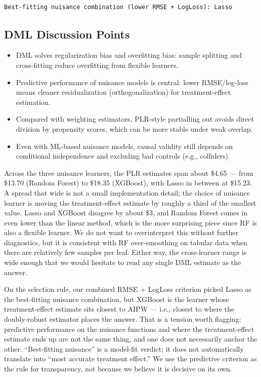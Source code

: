 \documentclass[
  letterpaper,
  DIV=11,
  numbers=noendperiod]{scrartcl}
\providecommand{\tightlist}{%
  \setlength{\itemsep}{0pt}\setlength{\parskip}{0pt}}
\begin{document}
\begin{verbatim}

Best-fitting nuisance combination (lower RMSE + LogLoss): Lasso 
\end{verbatim}

\subsection{DML Discussion Points}\label{dml-discussion-points}

\begin{itemize}
\tightlist
\item
  DML solves regularization bias and overfitting bias: sample splitting
  and cross-fitting reduce overfitting from flexible learners.
\item
  Predictive performance of nuisance models is central: lower
  RMSE/log-loss means cleaner residualization (orthogonalization) for
  treatment-effect estimation.
\item
  Compared with weighting estimators, PLR-style partialling out avoids
  direct division by propensity scores, which can be more stable under
  weak overlap.
\item
  Even with ML-based nuisance models, causal validity still depends on
  conditional independence and excluding bad controls (e.g., colliders).
\end{itemize}

Across the three nuisance learners, the PLR estimates span about \$4.65
--- from \$13.70 (Random Forest) to \$18.35 (XGBoost), with Lasso in
between at \$15.23. A spread that wide is not a small implementation
detail; the choice of nuisance learner is moving the treatment-effect
estimate by roughly a third of the smallest value. Lasso and XGBoost
disagree by about \$3, and Random Forest comes in even lower than the
linear method, which is the more surprising piece since RF is also a
flexible learner. We do not want to overinterpret this without further
diagnostics, but it is consistent with RF over-smoothing on tabular data
when there are relatively few samples per leaf. Either way, the
cross-learner range is wide enough that we would hesitate to read any
single DML estimate as the answer.

On the selection rule, our combined RMSE + LogLoss criterion picked
Lasso as the best-fitting nuisance combination, but XGBoost is the
learner whose treatment-effect estimate sits closest to AIPW --- i.e.,
closest to where the doubly-robust estimator places the answer. That is
a tension worth flagging: predictive performance on the nuisance
functions and where the treatment-effect estimate ends up are not the
same thing, and one does not necessarily anchor the other.
``Best-fitting nuisance'' is a model-fit verdict; it does not
automatically translate into ``most accurate treatment effect.'' We use
the predictive criterion as the rule for transparency, not because we
believe it is decisive on its own.
\end{document}

